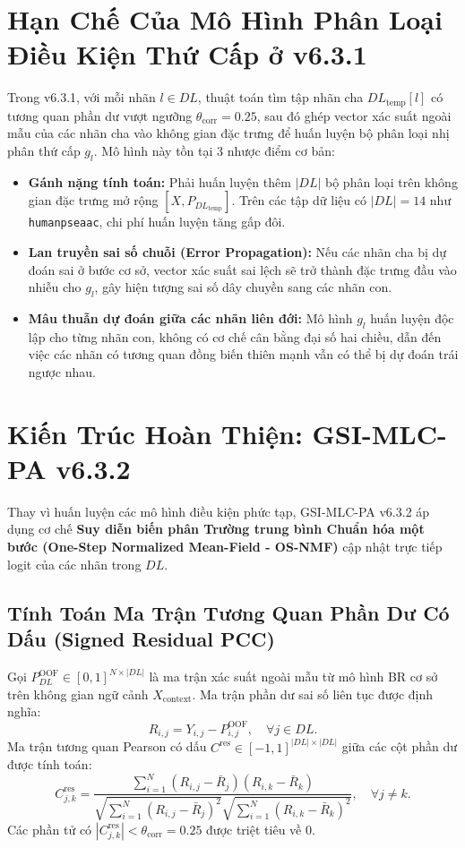 \documentclass[10pt,a4paper,twoside]{article}
\begin{document}
\section{Hạn Chế Của Mô Hình Phân Loại Điều Kiện Thứ Cấp ở v6.3.1}
Trong v6.3.1, với mỗi nhãn $l \in DL$, thuật toán tìm tập nhãn cha $DL_{\text{temp}}[l]$ có tương quan phần dư vượt ngưỡng $\theta_{\text{corr}} = 0.25$, sau đó ghép vector xác suất ngoài mẫu của các nhãn cha vào không gian đặc trưng để huấn luyện bộ phân loại nhị phân thứ cấp $g_l$. Mô hình này tồn tại 3 nhược điểm cơ bản:
\begin{itemize}[leftmargin=*]
    \item \textbf{Gánh nặng tính toán:} Phải huấn luyện thêm $|DL|$ bộ phân loại trên không gian đặc trưng mở rộng $[X, P_{DL_{\text{temp}}}]$. Trên các tập dữ liệu có $|DL| = 14$ như \texttt{humanpseaac}, chi phí huấn luyện tăng gấp đôi.
    \item \textbf{Lan truyền sai số chuỗi (Error Propagation):} Nếu các nhãn cha bị dự đoán sai ở bước cơ sở, vector xác suất sai lệch sẽ trở thành đặc trưng đầu vào nhiễu cho $g_l$, gây hiện tượng sai số dây chuyền sang các nhãn con.
    \item \textbf{Mâu thuẫn dự đoán giữa các nhãn liên đới:} Mô hình $g_l$ huấn luyện độc lập cho từng nhãn con, không có cơ chế cân bằng đại số hai chiều, dẫn đến việc các nhãn có tương quan đồng biến thiên mạnh vẫn có thể bị dự đoán trái ngược nhau.
\end{itemize}

\section{Kiến Trúc Hoàn Thiện: GSI-MLC-PA v6.3.2}
Thay vì huấn luyện các mô hình điều kiện phức tạp, GSI-MLC-PA v6.3.2 áp dụng cơ chế \textbf{Suy diễn biến phân Trường trung bình Chuẩn hóa một bước (One-Step Normalized Mean-Field - OS-NMF)} cập nhật trực tiếp logit của các nhãn trong $DL$.

\subsection{Tính Toán Ma Trận Tương Quan Phần Dư Có Dấu (Signed Residual PCC)}
Gọi $P^{\text{OOF}}_{DL} \in [0, 1]^{N \times |DL|}$ là ma trận xác suất ngoài mẫu từ mô hình BR cơ sở trên không gian ngữ cảnh $X_{\text{context}}$. Ma trận phần dư sai số liên tục được định nghĩa:
\begin{equation}
R_{i, j} = Y_{i, j} - P^{\text{OOF}}_{i, j}, \quad \forall j \in DL.
\end{equation}
Ma trận tương quan Pearson có dấu $C^{\text{res}} \in [-1, 1]^{|DL| \times |DL|}$ giữa các cột phần dư được tính toán:
\begin{equation}
C^{\text{res}}_{j, k} = \frac{\sum_{i=1}^N (R_{i, j} - \bar{R}_j)(R_{i, k} - \bar{R}_k)}{\sqrt{\sum_{i=1}^N (R_{i, j} - \bar{R}_j)^2} \sqrt{\sum_{i=1}^N (R_{i, k} - \bar{R}_k)^2}}, \quad \forall j \neq k.
\end{equation}
Các phần tử có $|C^{\text{res}}_{j, k}| < \theta_{\text{corr}} = 0.25$ được triệt tiêu về $0$.
\end{document}
